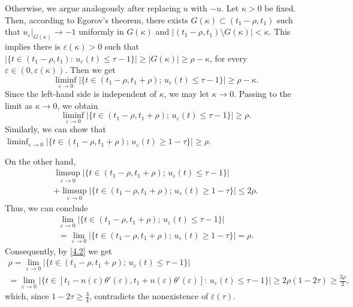 \documentclass[12pt]{article}
\numberwithin{equation}{section}
\def\e{\varepsilon}
\begin{document}
Otherwise, we argue analogously after replacing $u$ with $-u$. Let $\kappa>0$ be fixed. Then, according to Egorov's theorem, there exists $G(\kappa)\subset(t_{1}-\rho,t_{1})$ such that $u_{\varepsilon}|_{G(\kappa)}\to-1$ uniformly in $G(\kappa)$ and $|(t_{1}-\rho,t_{1})\setminus G(\kappa)|<\kappa$. This implies there is $\varepsilon(\kappa)>0$ such that 
$
|\{t\in(t_{1}-\rho,t_{1}):\,u_{\varepsilon}(t)\le\tau-1\}|\ge|G(\kappa)|\ge\rho-\kappa$, 
for every $\e\in(0,\e(\kappa))$. Then we get 
\[
\liminf_{\varepsilon\to0}|\{t\in(t_{1}-\rho,t_{1}+\rho);\,u_{\varepsilon}(t)\le\tau-1\}|\ge\rho-\kappa.
\]
Since the left-hand side is independent of $\kappa$, we may let $\kappa\to0$. Passing to the limit as $\kappa\to0$, we obtain 
\[
\liminf_{\varepsilon\to0}|\{t\in(t_{1}-\rho,t_{1}+\rho);\,u_{\varepsilon}(t)\le\tau-1\}|\ge\rho.
\]
Similarly, we can show that $\liminf_{\varepsilon\to0}|\{t\in(t_{1}-\rho,t_{1}+\rho);\,u_{\varepsilon}(t)\ge1-\tau\}|\ge\rho.$

On the other hand,
\begin{multline*}
    \limsup_{\varepsilon\to0}|\{t\in(t_{1}-\rho,t_{1}+\rho);\,u_{\varepsilon}(t)\le\tau-1\}|\\+\limsup_{\varepsilon\to0}|\{t\in(t_{1}-\rho,t_{1}+\rho);\,u_{\varepsilon}(t)\ge1-\tau\}|\le 2\rho.
\end{multline*}
Thus, we can conclude 
\begin{multline*}
    \lim_{\varepsilon\to0}|\{t\in(t_{1}-\rho,t_{1}+\rho);\,u_{\varepsilon}(t)\le\tau-1\}|\\=\lim_{\varepsilon\to0}|\{t\in(t_{1}-\rho,t_{1}+\rho);\,u_{\varepsilon}(t)\ge1-\tau\}|=\rho.
\end{multline*}
Consequently, by \eqref{4.2} we get
\begin{multline*}
     \rho=\lim_{\varepsilon\to0}|\{t\in(t_{1}-\rho,t_{1}+\rho);\,u_{\varepsilon}(t)\le\tau-1\}|\\=\lim_{\varepsilon\to0}|\{t\in[t_{1}-n(\varepsilon)\theta'(\e) ,t_{1}+n(\varepsilon)\theta'(\e) ]:\,u_{\varepsilon}(t)\le\tau-1\}|\ge2\rho(1-2\tau)\ge\frac{3\rho}{2},
\end{multline*}
which, since $1-2\tau
\ge\frac34$, contradicts the nonexistence of $\bar{\varepsilon}(\tau)$.
\end{document}
